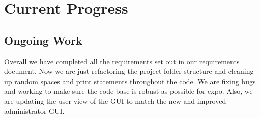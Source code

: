 \documentclass[draftclsnofoot, onecolumn, compsoc, 10pt]{IEEEtran}
\begin{document}
\section{Current Progress}
\subsection{Ongoing Work}
Overall we have completed all the requirements set out in our requirements document. Now we are just refactoring the project folder structure and cleaning up random spaces and print statements throughout the code. We are fixing bugs and working to make sure the code base is robust as possible for expo.
Also, we are updating the user view of the GUI to match the new and improved administrator GUI. 
\end{document}
